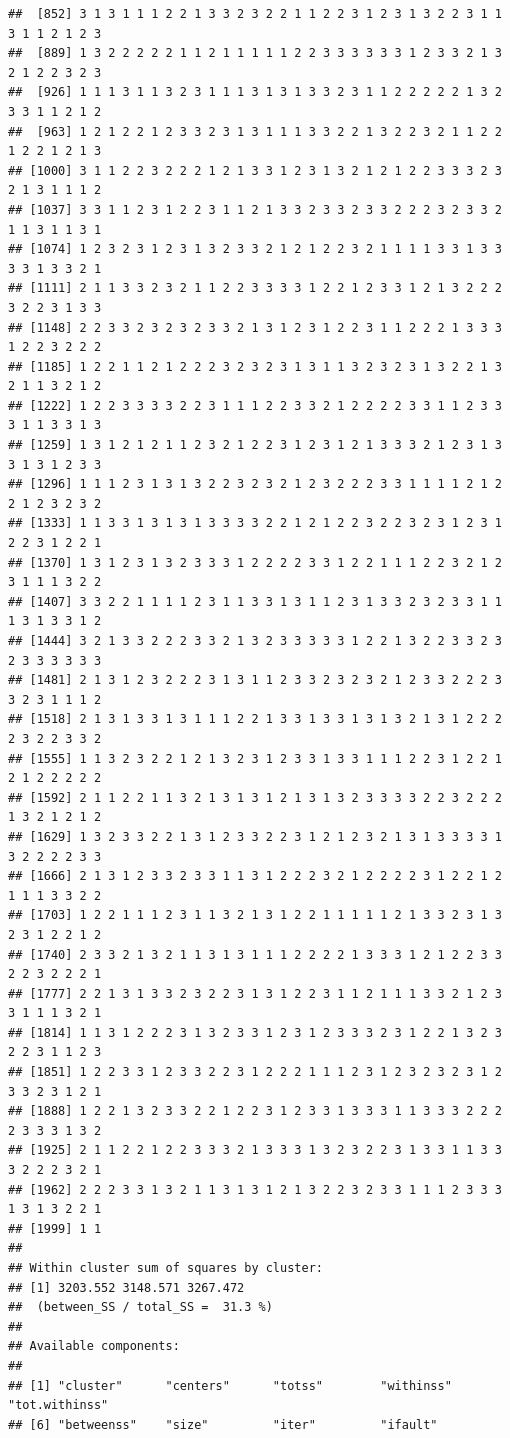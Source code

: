 \documentclass[
]{article}
\begin{document}
\begin{verbatim}
##  [852] 3 1 3 1 1 1 2 2 1 3 3 2 3 2 2 1 1 2 2 3 1 2 3 1 3 2 2 3 1 1 3 1 1 2 1 2 3
##  [889] 1 3 2 2 2 2 2 1 1 2 1 1 1 1 1 2 2 3 3 3 3 3 3 1 2 3 3 2 1 3 2 1 2 2 3 2 3
##  [926] 1 1 1 3 1 1 3 2 3 1 1 1 3 1 3 1 3 3 2 3 1 1 2 2 2 2 2 1 3 2 3 3 1 1 2 1 2
##  [963] 1 2 1 2 2 1 2 3 3 2 3 1 3 1 1 1 3 3 2 2 1 3 2 2 3 2 1 1 2 2 1 2 2 1 2 1 3
## [1000] 3 1 1 2 2 3 2 2 2 1 2 1 3 3 1 2 3 1 3 2 1 2 1 2 2 3 3 3 2 3 2 1 3 1 1 1 2
## [1037] 3 3 1 1 2 3 1 2 2 3 1 1 2 1 3 3 2 3 3 2 3 3 2 2 2 3 2 3 3 2 1 1 3 1 1 3 1
## [1074] 1 2 3 2 3 1 2 3 1 3 2 3 3 2 1 2 1 2 2 3 2 1 1 1 1 3 3 1 3 3 3 3 1 3 3 2 1
## [1111] 2 1 1 3 3 2 3 2 1 1 2 2 3 3 3 3 1 2 2 1 2 3 3 1 2 1 3 2 2 2 3 2 2 3 1 3 3
## [1148] 2 2 3 3 2 3 2 3 2 3 3 2 1 3 1 2 3 1 2 2 3 1 1 2 2 2 1 3 3 3 1 2 2 3 2 2 2
## [1185] 1 2 2 1 1 2 1 2 2 2 3 2 3 2 3 1 3 1 1 3 2 3 2 3 1 3 2 2 1 3 2 1 1 3 2 1 2
## [1222] 1 2 2 3 3 3 3 2 2 3 1 1 1 2 2 3 3 2 1 2 2 2 2 3 3 1 1 2 3 3 3 1 1 3 3 1 3
## [1259] 1 3 1 2 1 2 1 1 2 3 2 1 2 2 3 1 2 3 1 2 1 3 3 3 2 1 2 3 1 3 3 1 3 1 2 3 3
## [1296] 1 1 1 2 3 1 3 1 3 2 2 3 2 3 2 1 2 3 2 2 2 3 3 1 1 1 1 2 1 2 2 1 2 3 2 3 2
## [1333] 1 1 3 3 1 3 1 3 1 3 3 3 3 2 2 1 2 1 2 2 3 2 2 3 2 3 1 2 3 1 2 2 3 1 2 2 1
## [1370] 1 3 1 2 3 1 3 2 3 3 3 1 2 2 2 2 3 3 1 2 2 1 1 1 2 2 3 2 1 2 3 1 1 1 3 2 2
## [1407] 3 3 2 2 1 1 1 1 2 3 1 1 3 3 1 3 1 1 2 3 1 3 3 2 3 2 3 3 1 1 1 3 1 3 3 1 2
## [1444] 3 2 1 3 3 2 2 2 3 3 2 1 3 2 3 3 3 3 3 1 2 2 1 3 2 2 3 3 2 3 2 3 3 3 3 3 3
## [1481] 2 1 3 1 2 3 2 2 2 3 1 3 1 1 2 3 3 2 3 2 3 2 1 2 3 3 2 2 2 3 3 2 3 1 1 1 2
## [1518] 2 1 3 1 3 3 1 3 1 1 1 2 2 1 3 3 1 3 3 1 3 1 3 2 1 3 1 2 2 2 2 3 2 2 3 3 2
## [1555] 1 1 3 2 3 2 2 1 2 1 3 2 3 1 2 3 3 1 3 3 1 1 1 2 2 3 1 2 2 1 2 1 2 2 2 2 2
## [1592] 2 1 1 2 2 1 1 3 2 1 3 1 3 1 2 1 3 1 3 2 3 3 3 3 2 2 3 2 2 2 1 3 2 1 2 1 2
## [1629] 1 3 2 3 3 2 2 1 3 1 2 3 3 2 2 3 1 2 1 2 3 2 1 3 1 3 3 3 3 1 3 2 2 2 2 3 3
## [1666] 2 1 3 1 2 3 3 2 3 3 1 1 3 1 2 2 2 3 2 1 2 2 2 2 3 1 2 2 1 2 1 1 1 3 3 2 2
## [1703] 1 2 2 1 1 1 2 3 1 1 3 2 1 3 1 2 2 1 1 1 1 1 2 1 3 3 2 3 1 3 2 3 1 2 2 1 2
## [1740] 2 3 3 2 1 3 2 1 1 3 1 3 1 1 1 2 2 2 2 1 3 3 3 1 2 1 2 2 3 3 2 2 3 2 2 2 1
## [1777] 2 2 1 3 1 3 3 2 3 2 2 3 1 3 1 2 2 3 1 1 2 1 1 1 3 3 2 1 2 3 3 1 1 1 3 2 1
## [1814] 1 1 3 1 2 2 2 3 1 3 2 3 3 1 2 3 1 2 3 3 3 2 3 1 2 2 1 3 2 3 2 2 3 1 1 2 3
## [1851] 1 2 2 3 3 1 2 3 3 2 2 3 1 2 2 2 1 1 1 2 3 1 2 3 2 3 2 3 1 2 3 3 2 3 1 2 1
## [1888] 1 2 2 1 3 2 3 3 2 2 1 2 2 3 1 2 3 3 1 3 3 3 1 1 3 3 3 2 2 2 2 3 3 3 1 3 2
## [1925] 2 1 1 2 2 1 2 2 3 3 3 2 1 3 3 3 1 3 2 3 2 2 3 1 3 3 1 1 3 3 3 2 2 2 3 2 1
## [1962] 2 2 2 3 3 1 3 2 1 1 3 1 3 1 2 1 3 2 2 3 2 3 3 1 1 1 2 3 3 3 1 3 1 3 2 2 1
## [1999] 1 1
## 
## Within cluster sum of squares by cluster:
## [1] 3203.552 3148.571 3267.472
##  (between_SS / total_SS =  31.3 %)
## 
## Available components:
## 
## [1] "cluster"      "centers"      "totss"        "withinss"     "tot.withinss"
## [6] "betweenss"    "size"         "iter"         "ifault"
\end{verbatim}
\end{document}
